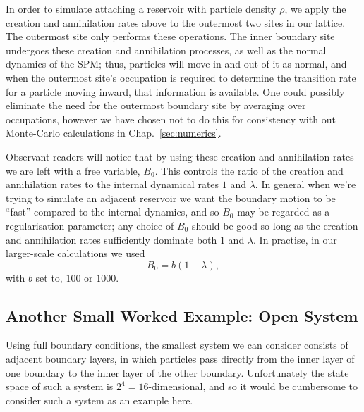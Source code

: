 In order to simulate attaching a reservoir with particle density $\rho$, we apply
the creation and annihilation rates above to the outermost two sites in our lattice.
The outermost site only performs these operations. The inner boundary site undergoes
these creation and annihilation processes, as well as the normal dynamics of the SPM;
thus, particles will move in and out of it as normal, and when the outermost site's
occupation is required to determine the transition rate for a particle moving inward,
that information is available. One could possibly eliminate the need for the outermost
boundary site by averaging over occupations, however we have chosen not to do this for
consistency with out Monte-Carlo calculations in Chap.~\ref{sec:numerics}.

Observant readers will notice that by using these creation and annihilation rates we
are left with a free variable, $B_0$. This controls the ratio of the creation and
annihilation rates to the internal dynamical rates $1$ and $\lambda$. In general
when we're trying to simulate an adjacent reservoir we want the boundary motion to be
``fast'' compared to the internal dynamics, and so $B_0$ may be regarded as a
regularisation parameter; any choice of $B_0$ should be good so long as
the creation and annihilation rates sufficiently dominate both $1$ and $\lambda$.
In practise, in our larger-scale calculations we  used
\begin{equation}
 B_0 = b(1+\lambda),
\end{equation}
with $b$ set to, $100$ or $1000$.

\subsection{Another Small Worked Example: Open System}

Using full boundary conditions, the smallest system we can consider consists of adjacent boundary
layers, in which particles pass directly from the inner layer of one boundary to the inner layer
of the other boundary. Unfortunately the state space of such a system is $2^4=16$-dimensional, and
so it would be cumbersome to consider such a system as an example here.


